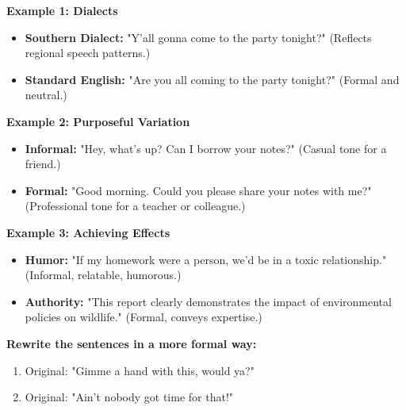 \documentclass[12pt]{article}
\begin{document}
\begin{tcolorbox}[colframe=black!60, colback=white, 
coltitle=black, colbacktitle=black!15, fonttitle=\bfseries\Large, 
title=Examples, halign title=center, left=10pt, right=10pt, top=10pt, bottom=15pt]

\textbf{Example 1: Dialects}
\begin{itemize}
    \item \textbf{Southern Dialect:} "Y'all gonna come to the party tonight?" (Reflects regional speech patterns.)
    \item \textbf{Standard English:} "Are you all coming to the party tonight?" (Formal and neutral.)
\end{itemize}

\textbf{Example 2: Purposeful Variation}
\begin{itemize}
    \item \textbf{Informal:} "Hey, what's up? Can I borrow your notes?" (Casual tone for a friend.)
    \item \textbf{Formal:} "Good morning. Could you please share your notes with me?" (Professional tone for a teacher or colleague.)
\end{itemize}

\textbf{Example 3: Achieving Effects}
\begin{itemize}
    \item \textbf{Humor:} "If my homework were a person, we'd be in a toxic relationship." (Informal, relatable, humorous.)
    \item \textbf{Authority:} "This report clearly demonstrates the impact of environmental policies on wildlife." (Formal, conveys expertise.)
\end{itemize}

\end{tcolorbox}

\vspace{1em}

\begin{tcolorbox}[colframe=black!60, colback=white, 
coltitle=black, colbacktitle=black!15, fonttitle=\bfseries\Large, 
title=Guided Practice, halign title=center, left=10pt, right=10pt, top=10pt, bottom=15pt]
\textbf{Rewrite the sentences in a more formal way:}
\begin{enumerate}[itemsep=3em]
    \item Original: "Gimme a hand with this, would ya?"  
\vspace{2cm}

    \item Original: "Ain't nobody got time for that!"  
 \vspace{3cm}


   
\end{enumerate}
\end{tcolorbox}
\end{document}
